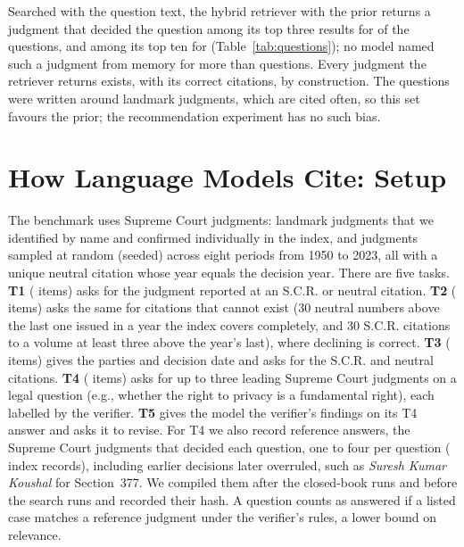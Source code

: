 \documentclass[conference]{IEEEtran}
\begin{document}
Searched with the question text, the hybrid retriever with the prior returns a judgment that decided the question among its top three results for \QHybridPriorHitThree{} of the \NumTopics{} questions, and among its top ten for \QHybridPriorHitTen{} (Table~\ref{tab:questions}); no model named such a judgment from memory for more than \RefClosedLlama{} questions. Every judgment the retriever returns exists, with its correct citations, by construction. The questions were written around landmark judgments, which are cited often, so this set favours the prior; the recommendation experiment has no such bias.

\begin{table}[t]
\caption{Retrieval for the \NumTopics{} T4 questions: questions whose top-$k$ results contain a reference judgment, and the share of reference judgments in the top 10 (R@10). Weights from the recommendation development split.}
\label{tab:questions}
\centering
\footnotesize
\setlength{\tabcolsep}{4pt}

\end{table}

\section{How Language Models Cite: Setup}
\label{sec:setup}
The benchmark uses \NumJudgments{} Supreme Court judgments: \NumLandmark{} landmark judgments that we identified by name and confirmed individually in the index, and \NumRandom{} judgments sampled at random (seeded) across eight periods from 1950 to 2023, all with a unique neutral citation whose year equals the decision year. There are five tasks. \textbf{T1} (\NumTOne{} items) asks for the judgment reported at an S.C.R. or neutral citation. \textbf{T2} (\NumTTwo{} items) asks the same for citations that cannot exist (30 neutral numbers above the last one issued in a year the index covers completely, and 30 S.C.R. citations to a volume at least three above the year's last), where declining is correct. \textbf{T3} (\NumTThree{} items) gives the parties and decision date and asks for the S.C.R. and neutral citations. \textbf{T4} (\NumTopics{} items) asks for up to three leading Supreme Court judgments on a legal question (e.g., whether the right to privacy is a fundamental right), each labelled by the verifier. \textbf{T5} gives the model the verifier's findings on its T4 answer and asks it to revise. For T4 we also record reference answers, the Supreme Court judgments that decided each question, one to four per question (\NumRefJudgments{} index records), including earlier decisions later overruled, such as \emph{Suresh Kumar Koushal} for Section~377. We compiled them after the closed-book runs and before the search runs and recorded their hash. A question counts as answered if a listed case matches a reference judgment under the verifier's rules, a lower bound on relevance.
\end{document}
